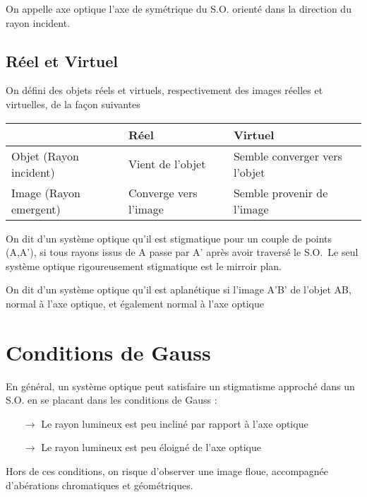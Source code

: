 \begin{de}
On appelle axe optique l'axe de symétrique du S.O. orienté dans la direction du rayon incident.
\end{de}

\subsection{Réel et Virtuel}

On défini des objets réels et virtuels, respectivement des images réelles et virtuelles, de la façon suivantes
\begin{center}
\begin{tabular}{|l|l|l|}
\hline
 & Réel & Virtuel \\\hline
Objet (Rayon incident) & Vient de l'objet & Semble converger vers l'objet \\\hline
Image (Rayon emergent)& Converge vers l'image & Semble provenir de l'image \\\hline
\end{tabular}
\end{center}

\begin{de}
On dit d'un système optique qu'il est stigmatique pour un couple de points (A,A'), si tous rayons issus de A passe par A' après avoir traversé le S.O.\
Le seul système optique rigoureusement stigmatique est le mirroir plan.
\end{de} 

\begin{de}
On dit d'un système optique qu'il est aplanétique si l'image A'B' de l'objet AB, normal à l'axe optique, et également normal à l'axe optique
\end{de} 

\section{Conditions de Gauss}

En général, un système optique peut satisfaire un stigmatisme approché dans un S.O. en se placant dans les conditions de Gauss :
\begin{itemize}
 \item[$\rightarrow$] Le rayon lumineux est peu incliné par rapport à l'axe optique
 \item[$\rightarrow$] Le rayon lumineux est peu éloigné de l'axe optique
\end{itemize}
Hors de ces conditions, on risque d'observer une image floue, accompagnée d'abérations chromatiques et géométriques.

